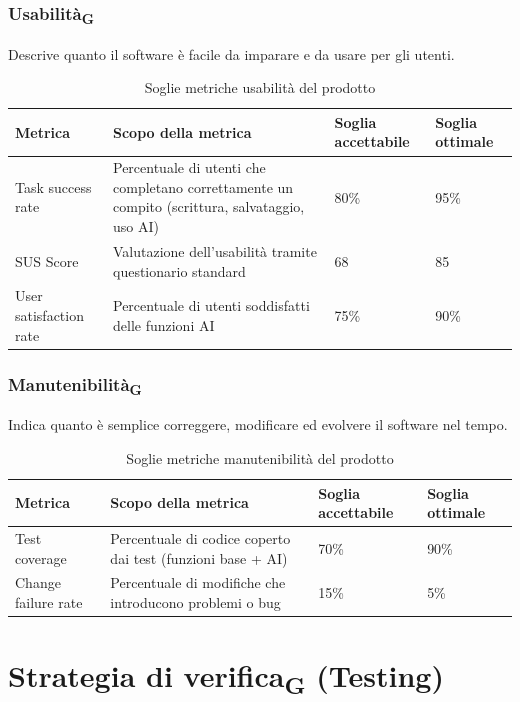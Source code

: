 \documentclass[11pt,a4paper]{article}
\newcommand{\gls}[1]{#1\textsubscript{G}}
\begin{document}
\subsubsection{Usabilità\textsubscript{G}}
Descrive quanto il software è facile da imparare e da usare per gli utenti.
\begin{table}[H]
\centering
\renewcommand{\arraystretch}{1.5}
\begin{tabular}{|M{0.25\textwidth}|M{0.35\textwidth}|M{0.15\textwidth}|M{0.15\textwidth}|}
\hline
\textbf{Metrica} & \textbf{Scopo della metrica} & \textbf{Soglia accettabile} & \textbf{Soglia ottimale} \\
\hline
Task success rate & Percentuale di utenti che completano correttamente un compito (scrittura, salvataggio, uso AI) & 80\% & 95\% \\ \hline
SUS Score & Valutazione dell’usabilità tramite questionario standard & 68 & 85 \\ \hline
User satisfaction rate & Percentuale di utenti soddisfatti delle funzioni AI & 75\% & 90\% \\
\hline
\end{tabular}
\caption{Soglie metriche usabilità del prodotto}
\end{table}

\subsubsection{Manutenibilità\textsubscript{G}}
Indica quanto è semplice correggere, modificare ed evolvere il software nel tempo.
\begin{table}[H]
\centering
\renewcommand{\arraystretch}{1.5}
\begin{tabular}{|M{0.25\textwidth}|M{0.35\textwidth}|M{0.15\textwidth}|M{0.15\textwidth}|}
\hline
\textbf{Metrica} & \textbf{Scopo della metrica} & \textbf{Soglia accettabile} & \textbf{Soglia ottimale} \\
\hline
Test coverage & Percentuale di codice coperto dai test (funzioni base + AI) & 70\% & 90\% \\ \hline
Change failure rate & Percentuale di modifiche che introducono problemi o bug & 15\% & 5\% \\
\hline
\end{tabular}
\caption{Soglie metriche manutenibilità del prodotto}
\end{table}

\newpage

\section{Strategia di \gls{verifica} (Testing)}
\end{document}
